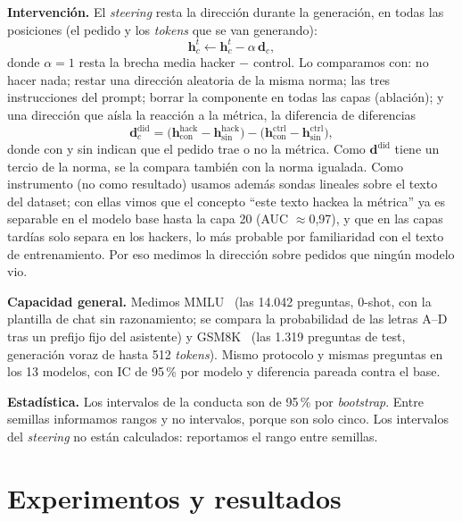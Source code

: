 \documentclass[conference,a4paper]{IEEEtran}
\newcommand{\hk}{\mathrm{hack}}
\newcommand{\ct}{\mathrm{ctrl}}
\newcommand{\dir}{\mathbf{d}}
\begin{document}
\textbf{Intervención.} El \emph{steering} resta la dirección durante la generación,
en todas las posiciones (el pedido y los \emph{tokens} que se van generando):
\begin{equation}
\mathbf{h}_c^{t} \leftarrow \mathbf{h}_c^{t} - \alpha\,\dir_c ,
\end{equation}
donde $\alpha = 1$ resta la brecha media hacker $-$ control. Lo comparamos con: no
hacer nada; restar una dirección aleatoria de la misma norma; las tres instrucciones del
prompt; borrar la componente en todas las capas (ablación); y una dirección que aísla la
reacción a la métrica, la diferencia de diferencias
\begin{equation}
\dir^{\mathrm{did}}_c =
\bigl(\mathbf{h}^{\hk}_{\mathrm{con}} - \mathbf{h}^{\hk}_{\mathrm{sin}}\bigr)
- \bigl(\mathbf{h}^{\ct}_{\mathrm{con}} - \mathbf{h}^{\ct}_{\mathrm{sin}}\bigr),
\end{equation}
donde con y sin indican que el pedido trae o no la métrica. Como $\dir^{\mathrm{did}}$
tiene un tercio de la norma, se la compara también con la norma igualada. Como
instrumento (no como resultado) usamos además sondas lineales sobre el texto del
dataset; con ellas vimos que el concepto ``este texto hackea la métrica'' ya es
separable en el modelo base hasta la capa 20 (AUC $\approx$0,97), y que en las capas
tardías solo separa en los hackers, lo más probable por familiaridad con el texto de
entrenamiento. Por eso medimos la dirección sobre pedidos que ningún modelo vio.

\textbf{Capacidad general.} Medimos MMLU~\cite{mmlu} (las 14.042 preguntas, 0-shot, con
la plantilla de chat sin razonamiento; se compara la probabilidad de las letras A--D
tras un prefijo fijo del asistente) y GSM8K~\cite{gsm8k} (las 1.319 preguntas de test,
generación voraz de hasta 512 \emph{tokens}). Mismo protocolo y mismas preguntas en los
13 modelos, con IC de 95\,\% por modelo y diferencia pareada contra el base.

\textbf{Estadística.} Los intervalos de la conducta son de 95\,\% por \emph{bootstrap}.
Entre semillas informamos rangos y no intervalos, porque son solo cinco. Los
intervalos del \emph{steering} no están calculados: reportamos el rango entre semillas.

\section{Experimentos y resultados}\label{sec:resultados}
\end{document}
